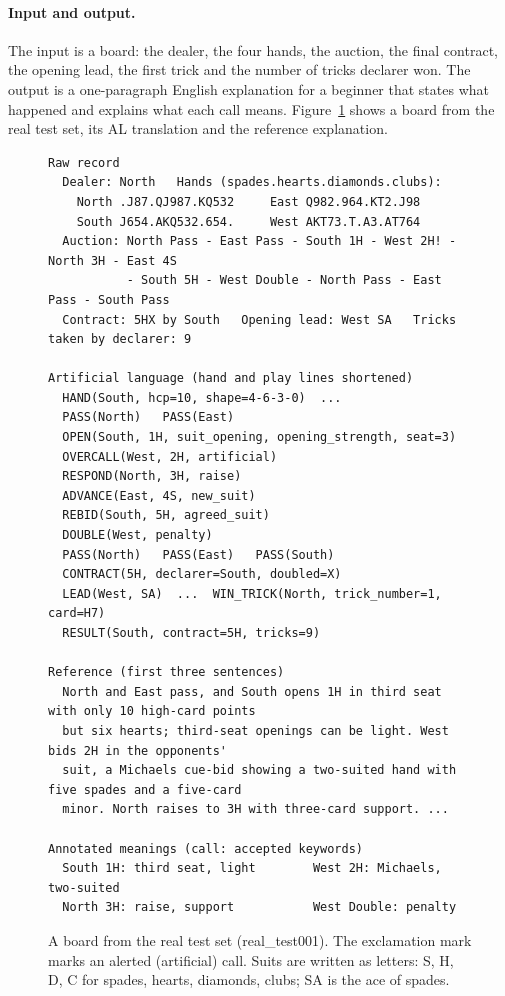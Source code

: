 \documentclass[11pt]{article}
\begin{document}
\paragraph{Input and output.} The input is a board: the dealer, the four hands, the auction, the final contract, the opening lead, the first trick and the number of tricks declarer won. The output is a one-paragraph English explanation for a beginner that states what happened and explains what each call means. Figure~\ref{fig:example} shows a board from the real test set, its AL translation and the reference explanation.

\begin{figure}[t]
\centering
\begin{lstlisting}[style=bridgecode,basicstyle=\ttfamily\footnotesize]
Raw record
  Dealer: North   Hands (spades.hearts.diamonds.clubs):
    North .J87.QJ987.KQ532     East Q982.964.KT2.J98
    South J654.AKQ532.654.     West AKT73.T.A3.AT764
  Auction: North Pass - East Pass - South 1H - West 2H! - North 3H - East 4S
           - South 5H - West Double - North Pass - East Pass - South Pass
  Contract: 5HX by South   Opening lead: West SA   Tricks taken by declarer: 9

Artificial language (hand and play lines shortened)
  HAND(South, hcp=10, shape=4-6-3-0)  ...
  PASS(North)   PASS(East)
  OPEN(South, 1H, suit_opening, opening_strength, seat=3)
  OVERCALL(West, 2H, artificial)
  RESPOND(North, 3H, raise)
  ADVANCE(East, 4S, new_suit)
  REBID(South, 5H, agreed_suit)
  DOUBLE(West, penalty)
  PASS(North)   PASS(East)   PASS(South)
  CONTRACT(5H, declarer=South, doubled=X)
  LEAD(West, SA)  ...  WIN_TRICK(North, trick_number=1, card=H7)
  RESULT(South, contract=5H, tricks=9)

Reference (first three sentences)
  North and East pass, and South opens 1H in third seat with only 10 high-card points
  but six hearts; third-seat openings can be light. West bids 2H in the opponents'
  suit, a Michaels cue-bid showing a two-suited hand with five spades and a five-card
  minor. North raises to 3H with three-card support. ...

Annotated meanings (call: accepted keywords)
  South 1H: third seat, light        West 2H: Michaels, two-suited
  North 3H: raise, support           West Double: penalty
\end{lstlisting}
\caption{A board from the real test set (real\_test001). The exclamation mark marks an alerted (artificial) call. Suits are written as letters: S, H, D, C for spades, hearts, diamonds, clubs; SA is the ace of spades.}
\label{fig:example}
\end{figure}
\end{document}
